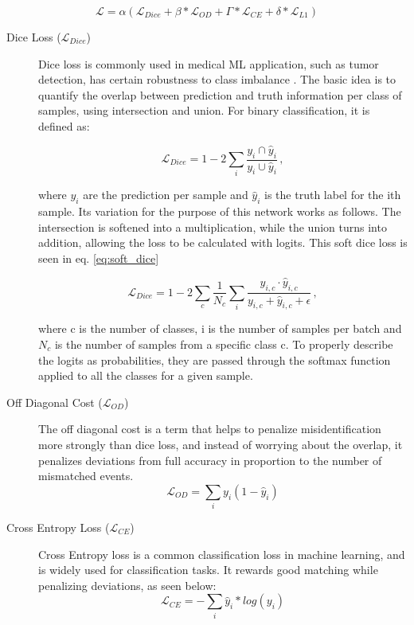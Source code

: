 \begin{equation}
	\mathcal{L} = \alpha(\mathcal{L}_{Dice} + \beta*\mathcal{L}_{OD} + \Gamma*\mathcal{L}_{CE} + \delta*\mathcal{L}_{L1}) 
\end{equation}

\begin{description}
	\item [Dice Loss ($\mathcal{L}_{Dice}$) ] Dice loss is commonly used in medical ML application, such as tumor detection, has certain robustness to class imbalance \cite{yeung_calibrating_2023}. The basic idea is to  quantify the overlap between prediction and truth information per class of samples, using intersection and union. For binary classification, it is defined as:
	
	\begin{equation}
		\mathcal{L}_{Dice} = 1 - 2\sum_{i}\frac{y_i \cap \hat{y}_i}{y_i \cup \hat{y}_i} \,,
	\end{equation}
	
	where $y_i$ are the prediction per sample and $\hat{y}_i$ is the truth label for the ith sample. Its variation for the purpose of this network works as follows. The intersection is softened into a multiplication, while the union turns into addition, allowing the loss to be calculated with logits. This soft dice loss is seen in eq. \ref{eq:soft_dice}
	
	\begin{equation}\label{eq:soft_dice}
		\mathcal{L}_{Dice} = 1 - 2\sum_{c}\frac{1}{N_c}\sum_{i}\frac{y_{i,c} \cdot \hat{y}_{i,c}}{y_{i,c} +\hat{y}_{i,c} +\epsilon}\,,
	\end{equation}
	
	where c is the number of classes, i is the number of samples per batch and $N_c$ is the number of samples from a specific class c.
	To properly describe the logits as probabilities, they are passed through the softmax function applied to all the classes for a given sample.
	
	\item [Off Diagonal Cost ($\mathcal{L}_{OD}$)] The off diagonal cost is a term that helps to penalize misidentification more strongly than dice loss, and instead of worrying about the overlap, it penalizes deviations from full accuracy in proportion to the number of mismatched events.
	\begin{equation}
		\mathcal{L}_{OD} = \sum_i y_i(1-\hat{y}_i)
	\end{equation}
	
	\item [Cross Entropy Loss ($\mathcal{L}_{CE}$)] Cross Entropy loss is a common classification loss in machine learning, and is widely used for classification tasks. It rewards good matching while penalizing deviations, as seen below:
	\begin{equation}
		\mathcal{L}_{CE} = -\sum_i\hat{y}_i * log(y_i)
	\end{equation}
	

\end{description}
